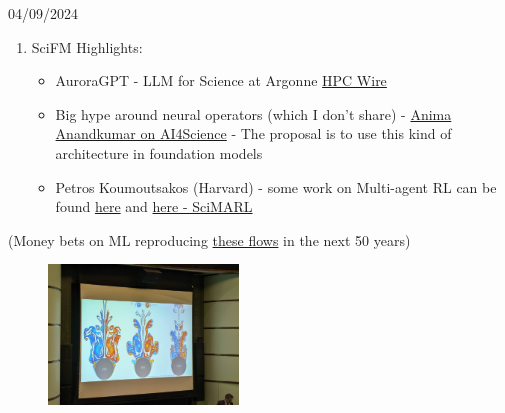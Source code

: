 \documentclass[usenames,dvipsnames]{beamer}
\theoremstyle{definition}
\begin{document}
\begin{frame}{04/09/2024}
\begin{enumerate}
    \item SciFM Highlights:
    \begin{itemize}
            \item AuroraGPT - LLM for Science at Argonne \href{https://www.hpcwire.com/2023/11/13/training-of-1-trillion-parameter-scientific-ai-begins/}{HPC Wire}
            
            \item Big hype around neural operators (which I don't share) - \href{https://www.youtube.com/watch?v=y5EJr4ofGOc}{Anima Anandkumar on AI4Science} - The proposal is to use this kind of architecture in foundation models
            
            \item Petros Koumoutsakos (Harvard) - some work on Multi-agent RL can be found \href{https://www.youtube.com/watch?v=QkrICARm34I}{here} and \href{https://www.nature.com/articles/s41467-022-28957-7}{here - SciMARL}
        \end{itemize}
\end{enumerate}

(Money bets on ML reproducing \href{https://www.cambridge.org/core/journals/journal-of-fluid-mechanics/article/vortex-separation-cascades-in-simulations-of-the-planar-flow-past-an-impulsively-started-cylinder-up-to-boldsymbolre100-boldsymbol000/F419F46158B994407F88BFA2A8410080}{these flows} in the next 50 years)

\begin{figure}
    \centering
    \includegraphics[width=0.45\textwidth]{reproduce_ML.jpg}
    \label{f: reproduce}
\end{figure}
\end{frame}



%     
\end{document}
